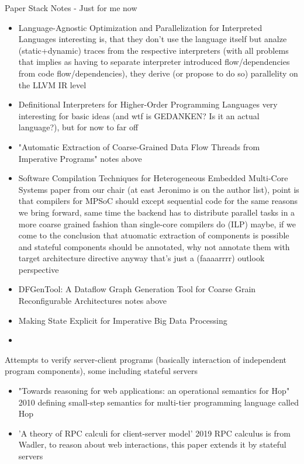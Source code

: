 Paper Stack Notes - Just for me now
\begin{itemize}
    \item Language-Agnostic Optimization and Parallelization for Interpreted Languages \means interesting is, that they don't use the language itself but analze (static+dynamic) traces from the respective interpreters (with all problems that implies as having to separate interpreter introduced flow/dependencies from code flow/dependencies), they derive (or propose to do so) parallelity on the LLVM IR level
    \item Definitional Interpreters for Higher-Order Programming Languages \means very interesting for basic ideas (and wtf is GEDANKEN? Is it an actual language?), but for now to far off
    \item "Automatic Extraction of Coarse-Grained Data Flow Threads from Imperative Programs" \means notes above
    \item Software Compilation Techniques for
Heterogeneous Embedded Multi-Core Systems \means paper from our chair (at east Jeronimo is on the author list), point is that compilers for MPSoC should except sequential code for the same reasons we bring forward, same time the backend has to distribute parallel tasks in a more coarse grained fashion than single-core compilers do (ILP) \means maybe, if we come to the conclusion that atuomatic extraction of components is possible and stateful components should be annotated, why not annotate them with target architecture directive \means anyway that's just a (faaaarrrr) outlook perspective
\item DFGenTool: A Dataflow Graph Generation Tool for Coarse Grain Reconfigurable Architectures \means notes above
\item Making State Explicit for Imperative Big Data Processing
\item
\end{itemize}


Attempts to verify server-client programs (basically interaction of independent program components), some including stateful servers
\begin{itemize}
    \item "Towards reasoning for web applications: an operational semantics for Hop" 2010 \means defining small-step semantics for multi-tier programming language called Hop
    \item 'A theory of RPC calculi for client-server model' 2019 \means RPC calculus is from Wadler, to reason about web interactions, this paper extends it by stateful servers  
\end{itemize}

